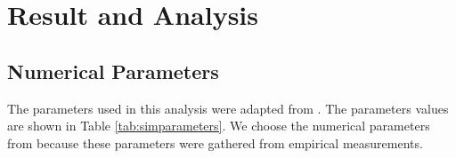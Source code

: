 

\section{Result and Analysis}\label{analysis}

\subsection{Numerical Parameters}

The parameters used in this analysis were adapted from \cite{baliga2007energy,valancius2009greening,Sun:2009:POS:1542245.1542249,Nedevschi:2008:HDC:1855610.1855618}. 
The parameters values are shown in Table \ref{tab:simparameters}.
We choose the numerical parameters from \cite{baliga2007energy,valancius2009greening,Sun:2009:POS:1542245.1542249,Nedevschi:2008:HDC:1855610.1855618}  because these parameters were gathered from empirical measurements. 

